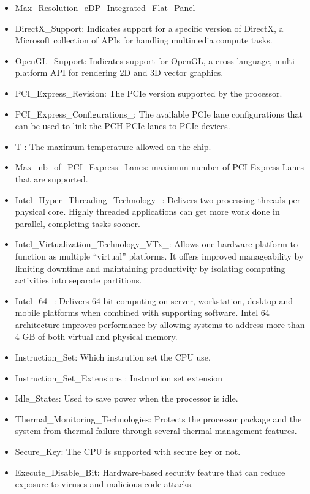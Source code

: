 \begin{itemize}
    \item Max\_Resolution\_eDP\_Integrated\_Flat\_Panel	
    \item DirectX\_Support: Indicates support for a specific version of DirectX, a Microsoft collection of APIs for handling multimedia compute tasks.
    \item OpenGL\_Support: Indicates support for OpenGL, a cross-language, multi-platform API for rendering 2D and 3D vector graphics. 
    \item PCI\_Express\_Revision: The PCIe version supported by the processor. 
    \item PCI\_Express\_Configurations\_: The available PCIe lane configurations that can be used to link the PCH PCIe lanes to PCIe devices.
    \item T : The maximum temperature allowed on the chip.
    \item Max\_nb\_of\_PCI\_Express\_Lanes: maximum number of PCI Express Lanes that are supported.
    \item Intel\_Hyper\_Threading\_Technology\_: Delivers two processing threads per physical core. Highly threaded applications can get more work done in parallel, completing tasks sooner.
    \item Intel\_Virtualization\_Technology\_VTx\_: Allows one hardware platform to function as multiple “virtual” platforms. It offers improved manageability by limiting downtime and maintaining productivity by isolating computing activities into separate partitions.
    \item Intel\_64\_: Delivers 64-bit computing on server, workstation, desktop and mobile platforms when combined with supporting software. Intel 64 architecture improves performance by allowing systems to address more than 4 GB of both virtual and physical memory.
    \item Instruction\_Set: Which instrution set the CPU use.
    \item Instruction\_Set\_Extensions :  Instruction set extension
    \item Idle\_States: Used to save power when the processor is idle.
    \item Thermal\_Monitoring\_Technologies: Protects the processor package and the system from thermal failure through several thermal management features.	
    \item Secure\_Key: The CPU is supported with secure key or not.
    \item Execute\_Disable\_Bit: Hardware-based security feature that can reduce exposure to viruses and malicious code attacks.
\end{itemize}


